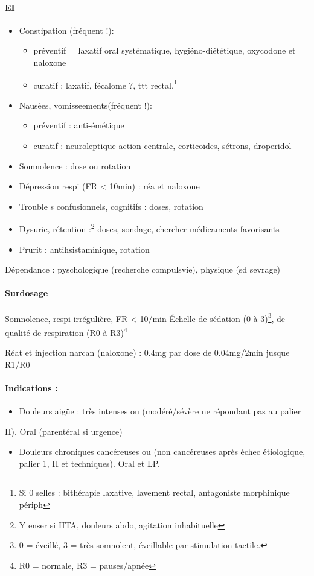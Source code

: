 \documentclass[11pt]{article}
\begin{document}
\paragraph{EI}
\label{sec:org78177bc}
\begin{itemize}
\item Constipation (fréquent !):
\begin{itemize}
\item préventif = laxatif oral systématique, hygiéno-diététique, oxycodone et
naloxone
\item curatif : \inc laxatif, fécalome ?, ttt rectal.\footnote{Si 0 selles : bithérapie laxative, lavement rectal, antagoniste
morphinique périph}
\end{itemize}
\item Nausées, vomisseements(fréquent !):
\begin{itemize}
\item préventif : anti-émétique
\item curatif : neuroleptique action centrale, corticoïdes, sétrons, droperidol
\end{itemize}
\item Somnolence : \dec dose ou rotation
\item Dépression respi (FR < 10min) : réa et naloxone
\item Trouble s confusionnels, cognitifs : \dec doses, rotation
\item Dysurie, rétention :\footnote{Y enser si HTA, douleurs abdo, agitation inhabituelle} \dec doses, sondage, chercher médicaments favorisants
\item Prurit : antihsistaminique, rotation
\end{itemize}

Dépendance : pyschologique (recherche compulsvie), physique (sd sevrage)

\paragraph{Surdosage}
\label{sec:orgca0a3b4}
Somnolence, respi irrégulière, FR < 10/min
Échelle de sédation (0 à 3)\footnote{0 = éveillé, 3 = très somnolent, éveillable par stimulation tactile.}, de qualité de respiration (R0 à R3)\footnote{R0 = normale, R3 = pauses/apnée}

Réat et injection narcan (naloxone) : 0.4mg par dose de 0.04mg/2min jusque R1/R0

\paragraph{Indications :}
\label{sec:org3cb4539}
\begin{itemize}
\item Douleurs aigüe : très intenses ou (modéré/sévère ne répondant pas au palier
\end{itemize}
II). Oral (parentéral si urgence)
\begin{itemize}
\item Douleurs chroniques cancéreuses ou (non cancéreuses après échec étiologique,
palier 1, II et techniques). Oral et LP.
\end{itemize}
\end{document}
